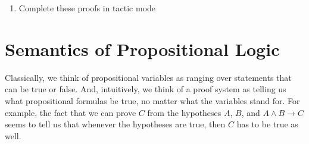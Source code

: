 \documentclass[letterpaper,10pt,english]{sphinxmanual}
\begin{document}
\begin{enumerate}
\begin{sphinxVerbatim}[commandchars=\\\{\}]
              
           
         

\end{sphinxVerbatim}

\item {} 
\sphinxAtStartPar
Complete these proofs in tactic mode

\begin{sphinxVerbatim}[commandchars=\\\{\}]
 
     

             

            

\end{sphinxVerbatim}

\end{enumerate}


\chapter{Semantics of Propositional Logic}
\label{\detokenize{semantics_of_propositional_logic:semantics-of-propositional-logic}}\label{\detokenize{semantics_of_propositional_logic:id1}}\label{\detokenize{semantics_of_propositional_logic::doc}}
\sphinxAtStartPar
Classically, we think of propositional variables as ranging over statements that can be true or false. And, intuitively, we think of a proof system as telling us what propositional formulas  be true, no matter what the variables stand for. For example, the fact that we can prove \(C\) from the hypotheses \(A\), \(B\), and \(A \wedge B \to C\) seems to tell us that whenever the hypotheses are true, then \(C\) has to be true as well.
\end{document}
